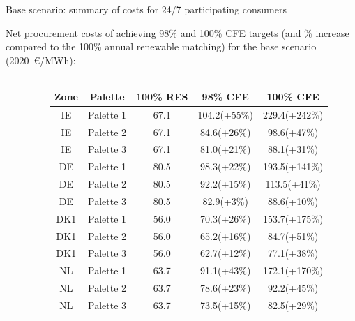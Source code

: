 \begin{frame}{Base scenario: summary of costs for 24/7 participating consumers}

  {\small 

  Net procurement costs of achieving 98\% and 100\% CFE targets
  (and \% increase compared to the 100\% annual renewable matching) 
  for the base scenario (2020~\euro/MWh):
  }
  \begin{columns}[T]
  \begin{column}{5cm}
   \centering
    \vspace{0.4cm}
    \noindent{}

    \vspace{0.3cm}
    \noindent{}
    
  \end{column}

  \begin{column}{9cm}
  
  \centering
  {\footnotesize
  \begin{table}[h]
  \begin{tabular}{ccccc}
    \hline
    {\bf Zone} & {\bf Palette} &  {\bf 100\% RES} & {\bf 98\% CFE} & {\bf 100\% CFE} \\
    \hline
    \hline
    IE & Palette 1 & 67.1 & 104.2(+55\%) & 229.4(+242\%) \\ 
    \hline
    IE & Palette 2 & 67.1 & 84.6(+26\%) & 98.6(+47\%) \\
    \hline
    IE & Palette 3 & 67.1 & 81.0(+21\%) & 88.1(+31\%) \\
    \hline
    \hline
    DE & Palette 1 & 80.5 & 98.3(+22\%) & 193.5(+141\%) \\ 
    \hline
    DE & Palette 2 & 80.5 & 92.2(+15\%) & 113.5(+41\%) \\
    \hline
    DE & Palette 3 & 80.5 & 82.9(+3\%) & 88.6(+10\%) \\
    \hline
    \hline
    DK1 & Palette 1 & 56.0 & 70.3(+26\%) & 153.7(+175\%) \\ 
    \hline
    DK1  & Palette 2 & 56.0 & 65.2(+16\%) & 84.7(+51\%) \\
    \hline
    DK1  &  Palette 3 & 56.0 & 62.7(+12\%) & 77.1(+38\%) \\
    \hline
    \hline
    NL & Palette 1 & 63.7 & 91.1(+43\%) & 172.1(+170\%) \\ 
    \hline
    NL & Palette 2 & 63.7 & 78.6(+23\%)  & 92.2(+45\%) \\
    \hline
    NL &  Palette 3 & 63.7 & 73.5(+15\%) & 82.5(+29\%) \\
  \end{tabular}
  \end{table}
  }


\end{column}
\end{columns}
\end{frame}
